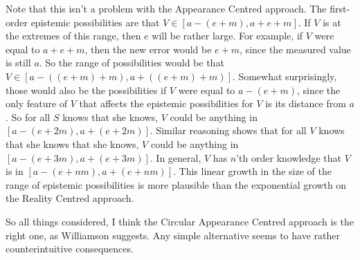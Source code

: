 Note that this isn't a problem with the Appearance Centred approach. The first-order epistemic possibilities are that $V \in [a - (e + m), a + e + m]$. If $V$ is at the extremes of this range, then $e$ will be rather large. For example, if $V$ were equal to $a + e + m$, then the new error would be $e + m$, since the measured value is still $a$. So the range of possibilities would be that $V \in [a - ((e + m) + m), a + ((e + m) + m)]$. Somewhat surprisingly, those would also be the possibilities if $V$ were equal to $a - (e + m)$, since the only feature of $V$ that affects the epistemic possibilities for $V$ is its distance from $a$. So for all $S$ knows that she knows, $V$ could be anything in $[a - (e + 2m), a + (e + 2m)]$. Similar reasoning shows that for all $V$ knows that she knows that she knows, $V$ could be anything in $[a - (e + 3m), a + (e + 3m)]$. In general, $V$ has $n$'th order knowledge that $V$ is in $[a - (e + nm), a + (e + nm)]$. This linear growth in the size of the range of epistemic possibilities is more plausible than the exponential growth on the Reality Centred approach.

So all things considered, I think the Circular Appearance Centred approach is the right one, as Williamson suggests. Any simple alternative seems to have rather counterintuitive consequences.